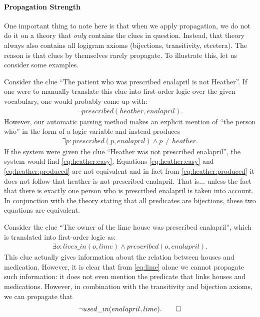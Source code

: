 \paragraph{Propagation Strength}
One important thing to note here is that when we apply propagation, we do not do it on a theory that \emph{only} contains the clues in question. Instead, that theory always also contains all logigram axioms (bijections, transitivity, etcetera). 
The reason is that clues by themselves rarely propagate. To illustrate this, let us consider some examples. 
\begin{example}
 Consider the clue ``The patient who was prescribed enalapril is not Heather''. If one were to manually translate this clue into first-order logic over the given vocabulary, one would probably come up with: 
 \begin{align}\lnot \mathit{prescribed}(heather,enalapril).\label{eq:heather:easy}\end{align}
 However, our automatic parsing method makes an explicit mention of ``the person who'' in the form of a logic variable and instead produces 
 \begin{align}
  \exists p: prescribed(p,enalapril) \land p \neq heather.\label{eq:heather:produced}
\end{align}
If the system were given the clue ``Heather was not prescribed enalapril'', the system would find \eqref{eq:heather:easy}.
Equations \eqref{eq:heather:easy} and \eqref{eq:heather:produced} are not equivalent and in fact from \eqref{eq:heather:produced} it does not follow that heather is not prescribed enalapril. That is... unless the fact that there is exactly one person who is prescribed enalapril is taken into account. In conjunction with the theory stating that all predicates are bijections, these two equations are equivalent. 
% 
% 
\end{example}

\begin{example}
 Consider the clue ``The owner of the lime house was prescribed enalapril'', which is translated into first-order logic as:
 \begin{align}
\exists o: lives\_in(o,lime) \land prescribed(o,enalapril).   \label{eq:lime}
 \end{align}
 This clue actually gives information about the relation between houses and medication. However, it is clear that from \eqref{eq:lime} alone we cannot propagate such information: it does not even mention the predicate that links houses and medications. 
 However, in combination with the transitivity and bijection axioms, we can propagate that 
 \[\lnot used\_in(enalapril,lime).\qedhere\]
\end{example}

